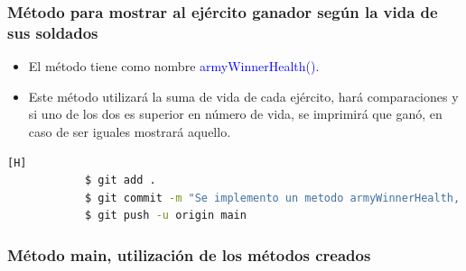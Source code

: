 \documentclass{article}
\begin{document}
        
        \subsubsection{Método para mostrar al ejército ganador según la vida de sus soldados}
        
        \begin{itemize}
            \item El método tiene como nombre \textcolor{blue}{armyWinnerHealth()}.
            \item Este método utilizará la suma de vida de cada ejército, hará comparaciones y si uno de los dos es superior en número de vida, se imprimirá que ganó, en caso de ser iguales mostrará aquello.
        \end{itemize}
        
        

        \begin{lstlisting}[language=bash,caption={Commit: Se implementaró el método armyWinnerHealth}][H]
    		$ git add .
    		$ git commit -m "Se implemento un metodo armyWinnerHealth, este mostrara al ganador en caso de una batalla, la cual da como ganador al que tenga la mayor suma de vida en soldados"	
    		$ git push -u origin main
    	\end{lstlisting}
        
        \subsubsection{Método main, utilización de los métodos creados}
        
\end{document}
